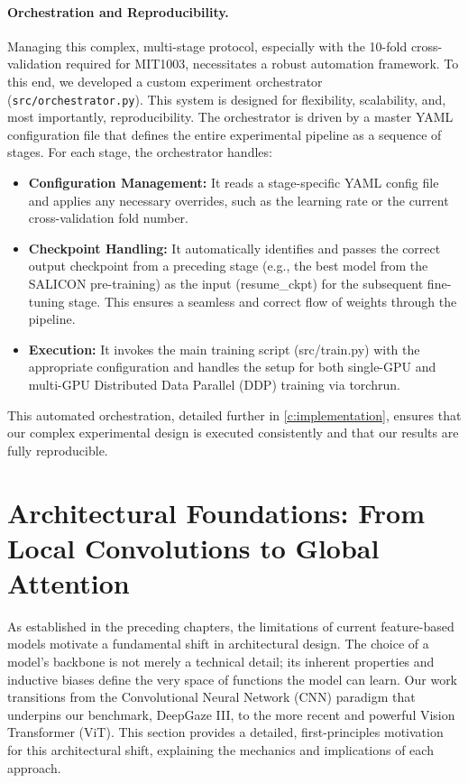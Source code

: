 \paragraph{Orchestration and Reproducibility.} Managing this complex, multi-stage protocol, especially with the 10-fold cross-validation required for MIT1003, necessitates a robust automation framework. To this end, we developed a custom experiment orchestrator (\texttt{src/orchestrator.py}). This system is designed for flexibility, scalability, and, most importantly, reproducibility.
The orchestrator is driven by a master YAML configuration file that defines the entire experimental pipeline as a sequence of stages. For each stage, the orchestrator handles:
\begin{itemize}
    \item \textbf{Configuration Management:} It reads a stage-specific YAML config file and applies any necessary overrides, such as the learning rate or the current cross-validation fold number.
    \item \textbf{Checkpoint Handling:} It automatically identifies and passes the correct output checkpoint from a preceding stage (e.g., the best model from the SALICON pre-training) as the input (resume\_ckpt) for the subsequent fine-tuning stage. This ensures a seamless and correct flow of weights through the pipeline.
    \item \textbf{Execution:} It invokes the main training script (src/train.py) with the appropriate configuration and handles the setup for both single-GPU and multi-GPU Distributed Data Parallel (DDP) training via torchrun.
\end{itemize}
This automated orchestration, detailed further in \cref{c:implementation}, ensures that our complex experimental design is executed consistently and that our results are fully reproducible.


\section[Architectural Foundations]{Architectural Foundations: From Local Convolutions to Global Attention}
\label{sec:method_foundations}

As established in the preceding chapters, the limitations of current feature-based models motivate a fundamental shift in architectural design. The choice of a model's backbone is not merely a technical detail; its inherent properties and inductive biases define the very space of functions the model can learn. Our work transitions from the Convolutional Neural Network (CNN) paradigm that underpins our benchmark, DeepGaze III, to the more recent and powerful Vision Transformer (ViT). This section provides a detailed, first-principles motivation for this architectural shift, explaining the mechanics and implications of each approach.

